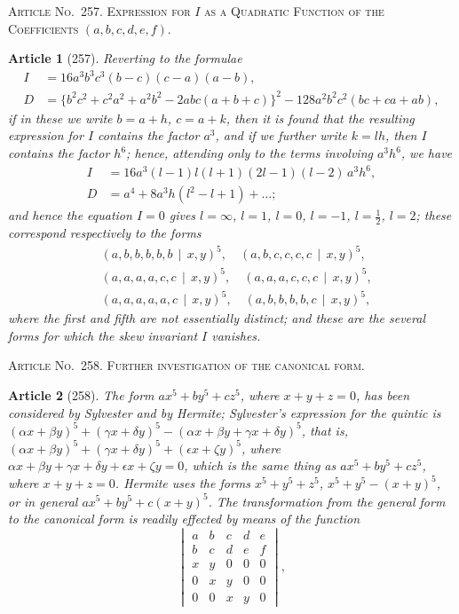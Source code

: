 \documentclass[11pt,a4paper]{article}
\theoremstyle{cayley}
\newtheorem{art}{Article}
\begin{document}
\begin{center}
\textsc{Article No.\ 257. Expression for $I$ as a Quadratic Function of the Coefficients $(a, b, c, d, e, f)$.}
\end{center}

\begin{art}[257]
Reverting to the formulae
\begin{align*}
I &= 16a^3b^3c^3(b-c)(c-a)(a-b), \\
D &= \{b^2c^2 + c^2a^2 + a^2b^2 - 2abc(a+b+c)\}^2 - 128a^2b^2c^2(bc+ca+ab),
\end{align*}
if in these we write $b = a + h$, $c = a + k$, then it is found that the resulting expression for $I$ contains the factor $a^3$, and if we further write $k = lh$, then $I$ contains the factor $h^6$; hence, attending only to the terms involving $a^3h^6$, we have
\begin{align*}
I &= 16a^3(l-1)l(l+1)(2l-1)(l-2)\,a^3h^6, \\
D &= a^4 + 8a^3h(l^2-l+1) + \dots;
\end{align*}
and hence the equation $I=0$ gives $l = \infty$, $l = 1$, $l = 0$, $l = -1$, $l = \frac{1}{2}$, $l = 2$; these correspond respectively to the forms
\begin{align*}
&(a, b, b, b, b, b \,\mid\, x, y)^5, \quad (a, b, c, c, c, c \,\mid\, x, y)^5, \\
&(a, a, a, a, c, c \,\mid\, x, y)^5, \quad (a, a, a, c, c, c \,\mid\, x, y)^5, \\
&(a, a, a, a, a, c \,\mid\, x, y)^5, \quad (a, b, b, b, b, c \,\mid\, x, y)^5,
\end{align*}
where the first and fifth are not essentially distinct; and these are the several forms for which the skew invariant $I$ vanishes.
\end{art}

\begin{center}
\textsc{Article No.\ 258. Further investigation of the canonical form.}
\end{center}

\begin{art}[258]
The form $ax^5 + by^5 + cz^5$, where $x + y + z = 0$, has been considered by Sylvester and by Hermite; Sylvester's expression for the quintic is $(\alpha x + \beta y)^5 + (\gamma x + \delta y)^5 - (\alpha x + \beta y + \gamma x + \delta y)^5$, that is, $(\alpha x + \beta y)^5 + (\gamma x + \delta y)^5 + (\epsilon x + \zeta y)^5$, where $\alpha x + \beta y + \gamma x + \delta y + \epsilon x + \zeta y = 0$, which is the same thing as $ax^5 + by^5 + cz^5$, where $x + y + z = 0$. Hermite uses the forms $x^5 + y^5 + z^5$, $x^5 + y^5 - (x+y)^5$, or in general $ax^5 + by^5 + c(x+y)^5$. The transformation from the general form to the canonical form is readily effected by means of the function
\[
\begin{vmatrix}
a & b & c & d & e \\
b & c & d & e & f \\
x & y & 0 & 0 & 0 \\
0 & x & y & 0 & 0 \\
0 & 0 & x & y & 0
\end{vmatrix},
\]
\end{art}
\end{document}
